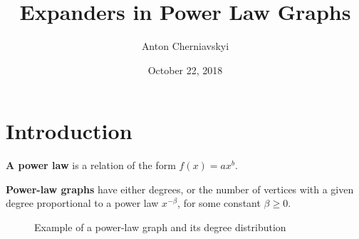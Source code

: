 \documentclass{beamer}
\title{Expanders in Power Law Graphs}
\author{Anton Cherniavskyi}
\date{October 22, 2018}
\institute{Simon Fraser University}
\newcommand{\autotitle}{\secname\ifdefempty{\subsecname}{}{~--- \subsecname}}
\newcommand{\clearsubsecname}{\long\def\subsecname{}}
\begin{document}
\maketitle

\section{Introduction}
\clearsubsecname

\begin{frame}{\autotitle}
    \textbf{A power law} is a relation of the form $f(x)=ax^b$.

    \textbf{Power-law graphs} have either degrees,
    or the number of vertices with a given degree
    proportional to a power law $x^{-\beta}$, for some constant $\beta\geq0$.
    \begin{figure}
        \centering
        \qquad
        \caption{Example of a power-law graph and its degree distribution}
    \end{figure}
\end{frame}
\end{document}
